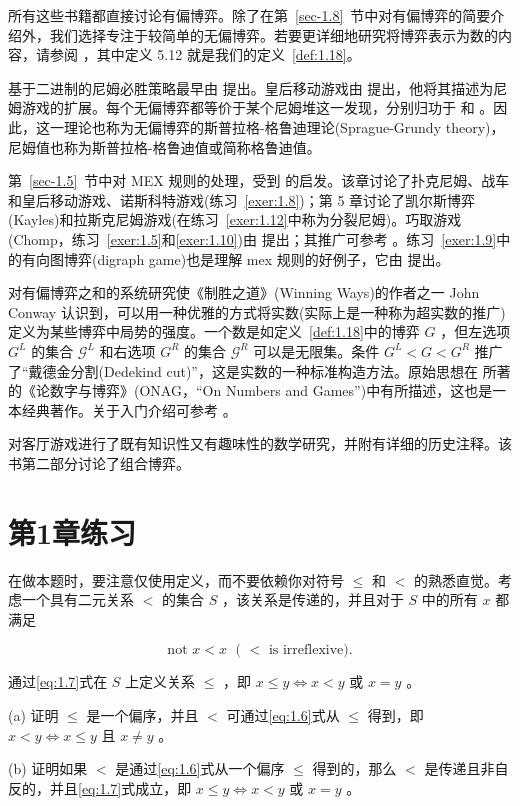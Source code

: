 所有这些书籍都直接讨论有偏博弈。除了在第~\ref{sec-1.8}~节中对有偏博弈的简要介绍外，我们选择专注于较简单的无偏博弈。若要更详细地研究将博弈表示为数的内容，请参阅 \citet*[Section~5.1]{albert2007}，其中定义 5.12 就是我们的定义~\ref{def:1.18}。

基于二进制的尼姆必胜策略最早由 \citet{bouton1901} 提出。皇后移动游戏由 \citet{wythoff1907} 提出，他将其描述为尼姆游戏的扩展。每个无偏博弈都等价于某个尼姆堆这一发现，分别归功于 \citet{sprague1935} 和 \citet{grundy1939}。因此，这一理论也称为无偏博弈的斯普拉格-格鲁迪理论(Sprague-Grundy theory)，尼姆值也称为斯普拉格-格鲁迪值或简称格鲁迪值。

第~\ref{sec-1.5}~节中对 MEX 规则的处理，受到 \citet*[Chapter~4]{berlekamp2001} 的启发。该章讨论了扑克尼姆、战车和皇后移动游戏、诺斯科特游戏(练习~\ref{exer:1.8})；第 5 章讨论了凯尔斯博弈(Kayles)和拉斯克尼姆游戏(在练习~\ref{exer:1.12}中称为分裂尼姆)。巧取游戏(Chomp，练习~\ref{exer:1.5}和\ref{exer:1.10})由 \citet{gale1974} 提出；其推广可参考 \citet{gale1982}。练习~\ref{exer:1.9}中的有向图博弈(digraph game)也是理解 mex 规则的好例子，它由 \citet{fraenkel1996} 提出。

对有偏博弈之和的系统研究使《制胜之道》(Winning Ways)的作者之一 John Conway 认识到，可以用一种优雅的方式将实数(实际上是一种称为超实数的推广)定义为某些博弈中局势的强度。一个数是如定义~\ref{def:1.18}中的博弈 \(G\) ，但左选项 \({G}^{L}\) 的集合 \({\mathcal{G}}^{L}\) 和右选项 \({G}^{R}\) 的集合 \({\mathcal{G}}^{R}\) 可以是无限集。条件 \({G}^{L} < G < {G}^{R}\) 推广了“戴德金分割(Dedekind cut)”，这是实数的一种标准构造方法。原始思想在 \citet{conway2001} 所著的《论数字与博弈》(ONAG，“On Numbers and Games”)中有所描述，这也是一本经典著作。关于入门介绍可参考 \citet{conway1977}。

\citet{bewersdorff2005} 对客厅游戏进行了既有知识性又有趣味性的数学研究，并附有详细的历史注释。该书第二部分讨论了组合博弈。

\section{第1章练习}

\begin{exercise}\label{exer:1.1}在做本题时，要注意仅使用定义，而不要依赖你对符号 \(\leq\) 和 \(<\) 的熟悉直觉。考虑一个具有二元关系 \(<\) 的集合 \(S\) ，该关系是传递的，并且对于 \(S\) 中的所有 \(x\) 都满足

\begin{equation}
\label{eq:1.38}
\text{ not }x < x\;\text{ ( } < \text{ is irreflexive). } 
\end{equation}

通过\eqref{eq:1.7}式在 \(S\) 上定义关系 \(\leq\) ，即 \(x \leq  y \Leftrightarrow  x < y\) 或 \(x = y\) 。

(a) 证明 \(\leq\) 是一个偏序，并且 \(<\) 可通过\eqref{eq:1.6}式从 \(\leq\) 得到，即 \(x < y \Leftrightarrow  x \leq  y\) 且 \(x \neq  y\) 。

(b) 证明如果 \(<\) 是通过\eqref{eq:1.6}式从一个偏序 \(\leq\) 得到的，那么 \(<\) 是传递且非自反的，并且\eqref{eq:1.7}式成立，即 \(x \leq  y \Leftrightarrow  x < y\) 或 \(x = y\) 。
\end{exercise}

